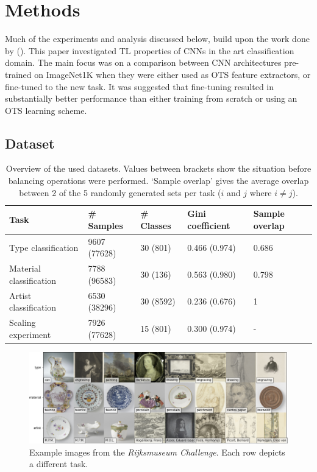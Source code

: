 \section{Methods}

Much of the experiments and analysis discussed below, build upon the work done by \citeauthor{sabatelli2018deep} (\citeyear{sabatelli2018deep}). This paper investigated TL properties of CNNs in the art classification domain. The main focus was on a comparison between CNN architectures pre-trained on ImageNet1K when they were either used as OTS feature extractors, or fine-tuned to the new task. It was suggested that fine-tuning resulted in substantially better performance than either training from scratch or using an OTS learning scheme.

\subsection{Dataset} \label{methods:dataset}

\begin{table}[tb]
\centering
\small
\begin{tabular}{lllll}
\hline
\textbf{Task} & \textbf{\# Samples} & \textbf{\# Classes} & \textbf{Gini coefficient} & \textbf{Sample overlap} \\ \hline
Type classification & 9607 (77628) & 30 (801) & 0.466 (0.974) & 0.686 \\
Material classification & 7788 (96583) & 30 (136) & 0.563 (0.980) & 0.798 \\
Artist classification & 6530 (38296) & 30 (8592) & 0.236 (0.676) & 1 \\
Scaling experiment & 7926 (77628) & 15 (801) & 0.300 (0.974) & - \\ \hline
\end{tabular}
\caption{Overview of the used datasets. Values between brackets show the situation before balancing operations were performed. `Sample overlap' gives the average overlap between 2 of the 5 randomly generated sets per task ($i$ and $j$ where $i \neq j$).}
\label{methods:datasets}
\end{table}

\begin{figure}[bt]
\includegraphics[width=\textwidth]{img/examples.png}
\caption{Example images from the \textit{Rijksmuseum Challenge}. Each row depicts a different task.}
\label{methods:eg}
\end{figure}

